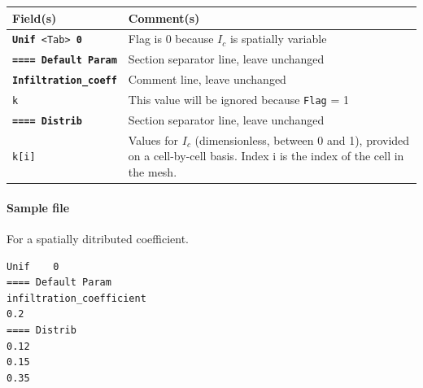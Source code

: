     \begin{tabular}{p{6cm} | p{9cm}}
    \hline
    Field(s) & Comment(s) \\
    \hline  \hline
    \texttt{\textbf{Unif} <Tab> \textbf{0}} & Flag is 0 because $I_c$ is spatially variable \\ 
    \hline
    \texttt{\textbf{==== Default Param}} & Section separator line, leave unchanged \\ 
    \hline
    \texttt{\textbf{Infiltration\_coeff}} & Comment line, leave unchanged \\ 
    \hline
    \texttt{k}     & This value will be ignored because \texttt{Flag} = 1 \\ 
    \hline
    \texttt{\textbf{==== Distrib}} & Section separator line, leave unchanged \\  
    \hline
    \texttt{k[i]}      & Values for $I_c$ (dimensionless, between 0 and 1), provided on a cell-by-cell basis. Index i is the index of the cell in the mesh.  \\ 
    \hline
    \end{tabular}

\paragraph*{Sample file}
For a spatially ditributed coefficient.

\begin{verbatim}
Unif	0
==== Default Param
infiltration_coefficient
0.2
==== Distrib
0.12
0.15
0.35
\end{verbatim}